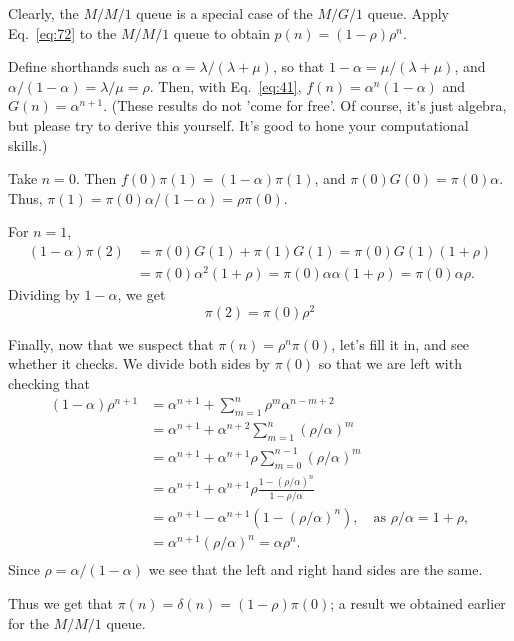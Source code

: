 \begin{exercise}
  Clearly, the $M/M/1$ queue is a special case of the $M/G/1$
  queue. Apply Eq.~\eqref{eq:72} to the $M/M/1$ queue to obtain $p(n)=(1-\rho)\rho^n$. 
  \begin{hint}
 Define shorthands
    such as $\alpha=\lambda/(\lambda+\mu)$, so that
    $1-\alpha = \mu/(\lambda+\mu)$, and
    $\alpha/(1-\alpha) = \lambda /\mu = \rho$.  Then, with Eq.~\ref{eq:41}, $f(n) = \alpha^n(1-\alpha)$ and $G(n) = \alpha^{n+1}$.  (These results do not 'come for
    free'. Of course, it's just algebra, but please try to derive this
    yourself. It's good to hone your computational skills.)
  \end{hint}
    \begin{solution}
      Take $n=0$. Then $f(0) \pi(1) = (1-\alpha)\pi(1)$, and
      $\pi(0)G(0) = \pi(0)\alpha$. Thus,
      $\pi(1) = \pi(0)\alpha/(1-\alpha) = \rho \pi(0)$. 

For $n=1$,
\begin{equation*}
  \begin{split}
  (1-\alpha)  \pi(2) 
&= \pi(0)G(1) + \pi(1)G(1) = \pi(0)G(1)(1+\rho) \\
&= \pi(0)\alpha^2(1+\rho) = \pi(0)\alpha \alpha (1+\rho) = \pi(0)\alpha \rho.
  \end{split}
\end{equation*}
Dividing by $1-\alpha$, we get
\begin{equation*}
  \pi(2) = \pi(0)\rho^2
\end{equation*}

Finally, now that we suspect that $\pi(n) = \rho^n \pi(0)$, let's fill
it in, and see whether it checks. We divide both sides by $\pi(0)$ so
that we are left with checking that
\begin{align*}
    (1-\alpha)\rho^{n+1} 
&= \alpha^{n+1} + \sum_{m=1}^n \rho^m \alpha^{n-m+2}  \\
&= \alpha^{n+1} + \alpha^{n+2}\sum_{m=1}^n (\rho/\alpha)^m  \\
&= \alpha^{n+1} + \alpha^{n+1}\rho \sum_{m=0}^{n-1} (\rho/\alpha)^m \\
&= \alpha^{n+1} + \alpha^{n+1}\rho \frac{1-(\rho/\alpha)^n}{1-\rho/\alpha}\\
&= \alpha^{n+1} - \alpha^{n+1}(1-(\rho/\alpha)^n), \quad\text{as } \rho/\alpha = 1+\rho,\\
&= \alpha^{n+1}(\rho/\alpha)^n = \alpha \rho^n.\\
\end{align*}
Since $\rho=\alpha/(1-\alpha)$ we see that the left and right hand sides are the same. 

Thus we get that $\pi(n) = \delta(n) = (1-\rho) \pi(0)$; a result we
obtained earlier for the $M/M/1$ queue.
\end{solution}
\end{exercise}


